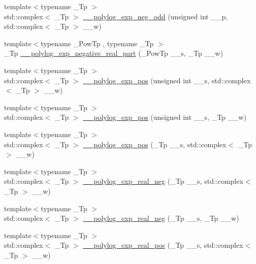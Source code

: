 \begin{DoxyCompactItemize}
\item 
{\footnotesize template$<$typename \+\_\+\+Tp $>$ }\\std\+::complex$<$ \+\_\+\+Tp $>$ \hyperlink{namespacestd_1_1____detail_a87c19d26841c10fcdd928d357191b66c}{\+\_\+\+\_\+polylog\+\_\+exp\+\_\+neg\+\_\+odd} (unsigned int \+\_\+\+\_\+p, std\+::complex$<$ \+\_\+\+Tp $>$ \+\_\+\+\_\+w)
\item 
{\footnotesize template$<$typename \+\_\+\+Pow\+Tp , typename \+\_\+\+Tp $>$ }\\\+\_\+\+Tp \hyperlink{namespacestd_1_1____detail_a466240361bcf30941d84a8fc3cd91cf9}{\+\_\+\+\_\+polylog\+\_\+exp\+\_\+negative\+\_\+real\+\_\+part} (\+\_\+\+Pow\+Tp \+\_\+\+\_\+s, \+\_\+\+Tp \+\_\+\+\_\+w)
\item 
{\footnotesize template$<$typename \+\_\+\+Tp $>$ }\\std\+::complex$<$ \+\_\+\+Tp $>$ \hyperlink{namespacestd_1_1____detail_a0327d2970eba3a0a2d73c71c7a77701c}{\+\_\+\+\_\+polylog\+\_\+exp\+\_\+pos} (unsigned int \+\_\+\+\_\+s, std\+::complex$<$ \+\_\+\+Tp $>$ \+\_\+\+\_\+w)
\item 
{\footnotesize template$<$typename \+\_\+\+Tp $>$ }\\std\+::complex$<$ \+\_\+\+Tp $>$ \hyperlink{namespacestd_1_1____detail_ab13a4be6685dd222b654da3297342d7e}{\+\_\+\+\_\+polylog\+\_\+exp\+\_\+pos} (unsigned int \+\_\+\+\_\+s, \+\_\+\+Tp \+\_\+\+\_\+w)
\item 
{\footnotesize template$<$typename \+\_\+\+Tp $>$ }\\std\+::complex$<$ \+\_\+\+Tp $>$ \hyperlink{namespacestd_1_1____detail_a56b0f5bc6f4955469fd5f83105cbd466}{\+\_\+\+\_\+polylog\+\_\+exp\+\_\+pos} (\+\_\+\+Tp \+\_\+\+\_\+s, std\+::complex$<$ \+\_\+\+Tp $>$ \+\_\+\+\_\+w)
\item 
{\footnotesize template$<$typename \+\_\+\+Tp $>$ }\\std\+::complex$<$ \+\_\+\+Tp $>$ \hyperlink{namespacestd_1_1____detail_abe2e38af779623f338c77dc46ac673bd}{\+\_\+\+\_\+polylog\+\_\+exp\+\_\+real\+\_\+neg} (\+\_\+\+Tp \+\_\+\+\_\+s, std\+::complex$<$ \+\_\+\+Tp $>$ \+\_\+\+\_\+w)
\item 
{\footnotesize template$<$typename \+\_\+\+Tp $>$ }\\std\+::complex$<$ \+\_\+\+Tp $>$ \hyperlink{namespacestd_1_1____detail_ac9ae4e4771187bac37c1ccc83719feb2}{\+\_\+\+\_\+polylog\+\_\+exp\+\_\+real\+\_\+neg} (\+\_\+\+Tp \+\_\+\+\_\+s, \+\_\+\+Tp \+\_\+\+\_\+w)
\item 
{\footnotesize template$<$typename \+\_\+\+Tp $>$ }\\std\+::complex$<$ \+\_\+\+Tp $>$ \hyperlink{namespacestd_1_1____detail_ab27023a3d94393d41c994000b2c16684}{\+\_\+\+\_\+polylog\+\_\+exp\+\_\+real\+\_\+pos} (\+\_\+\+Tp \+\_\+\+\_\+s, std\+::complex$<$ \+\_\+\+Tp $>$ \+\_\+\+\_\+w)

\end{DoxyCompactItemize}
